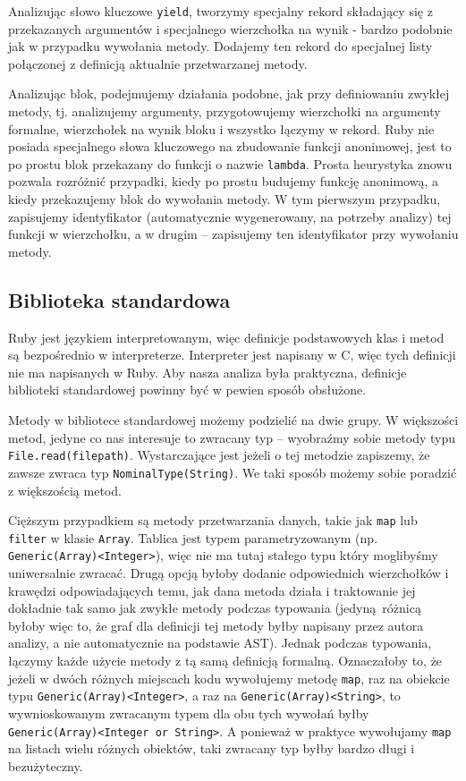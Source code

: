 \documentclass[declaration,shortabstract]{iithesis}
\begin{document}
Analizując słowo kluczowe \texttt{yield}, tworzymy specjalny rekord składający się z przekazanych argumentów i specjalnego wierzchołka na wynik - bardzo podobnie jak w przypadku wywołania metody. Dodajemy ten rekord do specjalnej listy połączonej z definicją aktualnie przetwarzanej metody.

Analizując blok, podejmujemy działania podobne, jak przy definiowaniu zwykłej metody, tj. analizujemy argumenty, przygotowujemy wierzchołki na argumenty formalne, wierzchołek na wynik bloku i wszystko łączymy w rekord. Ruby nie posiada specjalnego słowa kluczowego na zbudowanie funkcji anonimowej, jest to po prostu blok przekazany do funkcji o nazwie \texttt{lambda}. Prosta heurystyka znowu pozwala rozróżnić przypadki, kiedy po prostu budujemy funkcję anonimową, a kiedy przekazujemy blok do wywołania metody. W tym pierwszym przypadku, zapisujemy identyfikator (automatycznie wygenerowany, na potrzeby analizy) tej funkcji w wierzchołku, a w drugim -- zapisujemy ten identyfikator przy wywołaniu metody.


\subsection{Biblioteka standardowa}

Ruby jest językiem interpretowanym, więc definicje podstawowych klas i metod są bezpośrednio w interpreterze. Interpreter jest napisany w C, więc tych definicji nie ma napisanych w Ruby. Aby nasza analiza była praktyczna, definicje biblioteki standardowej powinny być w pewien sposób obsłużone.

Metody w bibliotece standardowej możemy podzielić na dwie grupy. W większości metod, jedyne co nas interesuje to zwracany typ -- wyobraźmy sobie metody typu \texttt{File.read(filepath)}. Wystarczające jest jeżeli o tej metodzie zapiszemy, że zawsze zwraca typ \texttt{NominalType(String)}. We taki sposób możemy sobie poradzić z większością metod.

Cięższym przypadkiem są metody przetwarzania danych, takie jak \texttt{map} lub \texttt{filter} w klasie \texttt{Array}. Tablica jest typem parametryzowanym (np. \texttt{Generic(Array)<Integer>}), więc nie ma tutaj stałego typu który moglibyśmy uniwersalnie zwracać. Drugą opcją byłoby dodanie odpowiednich wierzchołków i krawędzi odpowiadających temu, jak dana metoda działa i traktowanie jej dokładnie tak samo jak zwykłe metody podczas typowania (jedyną różnicą byłoby więc to, że graf dla definicji tej metody byłby napisany przez autora analizy, a nie automatycznie na podstawie AST). Jednak podczas typowania, łączymy każde użycie metody z tą samą definicją formalną. Oznaczałoby to, że jeżeli w dwóch różnych miejscach kodu wywołujemy metodę \texttt{map}, raz na obiekcie typu \texttt{Generic(Array)<Integer>}, a raz na \texttt{Generic(Array)<String>}, to wywnioskowanym zwracanym typem dla obu tych wywołań byłby \texttt{Generic(Array)<Integer or String>}. A ponieważ w praktyce wywołujamy \texttt{map} na listach wielu różnych obiektów, taki zwracany typ byłby bardzo długi i bezużyteczny.
\end{document}
